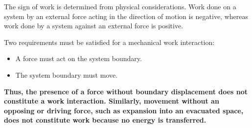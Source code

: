\documentclass[12pt]{article}
\begin{document}
The sign of work is determined from physical considerations. Work done on a system by an external force acting in the direction of motion is negative, whereas work done by a system against an external force is positive.

Two requirements must be satisfied for a mechanical work interaction:

\begin{itemize}
    \item A force must act on the system boundary.
    \item The system boundary must move.
\end{itemize}

\textbf{
Thus, the presence of a force without boundary displacement does not constitute a work interaction. Similarly, movement without an opposing or driving force, such as expansion into an evacuated space, does not constitute work because no energy is transferred.
}
\end{document}
